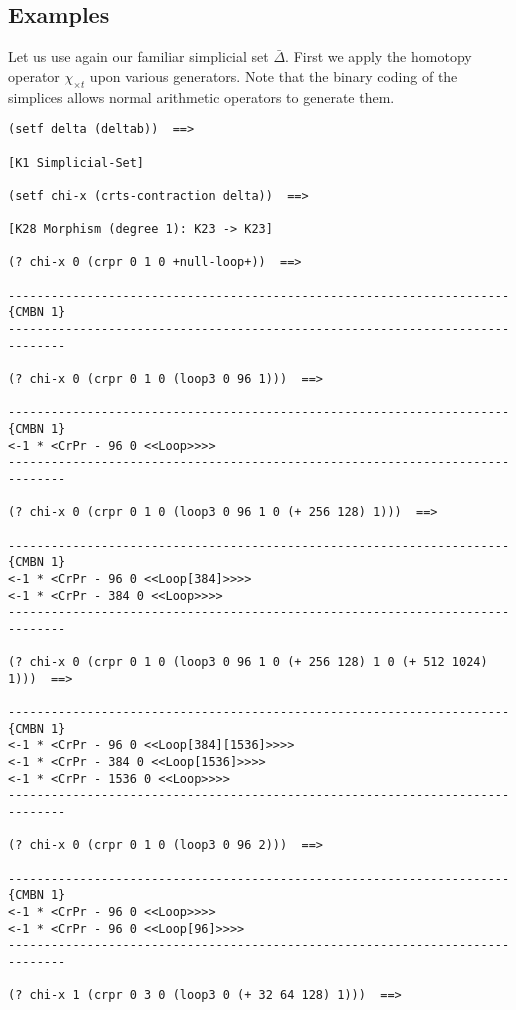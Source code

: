 \subsection* {Examples}

Let us use again our familiar simplicial set $\bar\Delta$. First we apply  the
homotopy operator $\chi_{\times t}$   upon various generators. 
Note that the binary coding of the simplices
allows normal arithmetic operators to generate them.
{\footnotesize\begin{verbatim}
(setf delta (deltab))  ==>

[K1 Simplicial-Set]

(setf chi-x (crts-contraction delta))  ==>

[K28 Morphism (degree 1): K23 -> K23]

(? chi-x 0 (crpr 0 1 0 +null-loop+))  ==>

----------------------------------------------------------------------{CMBN 1}
------------------------------------------------------------------------------

(? chi-x 0 (crpr 0 1 0 (loop3 0 96 1)))  ==>

----------------------------------------------------------------------{CMBN 1}
<-1 * <CrPr - 96 0 <<Loop>>>>
------------------------------------------------------------------------------

(? chi-x 0 (crpr 0 1 0 (loop3 0 96 1 0 (+ 256 128) 1)))  ==>

----------------------------------------------------------------------{CMBN 1}
<-1 * <CrPr - 96 0 <<Loop[384]>>>>
<-1 * <CrPr - 384 0 <<Loop>>>>
------------------------------------------------------------------------------

(? chi-x 0 (crpr 0 1 0 (loop3 0 96 1 0 (+ 256 128) 1 0 (+ 512 1024) 1)))  ==>

----------------------------------------------------------------------{CMBN 1}
<-1 * <CrPr - 96 0 <<Loop[384][1536]>>>>
<-1 * <CrPr - 384 0 <<Loop[1536]>>>>
<-1 * <CrPr - 1536 0 <<Loop>>>>
------------------------------------------------------------------------------

(? chi-x 0 (crpr 0 1 0 (loop3 0 96 2)))  ==>

----------------------------------------------------------------------{CMBN 1}
<-1 * <CrPr - 96 0 <<Loop>>>>
<-1 * <CrPr - 96 0 <<Loop[96]>>>>
------------------------------------------------------------------------------

(? chi-x 1 (crpr 0 3 0 (loop3 0 (+ 32 64 128) 1)))  ==>


\end{verbatim}}
